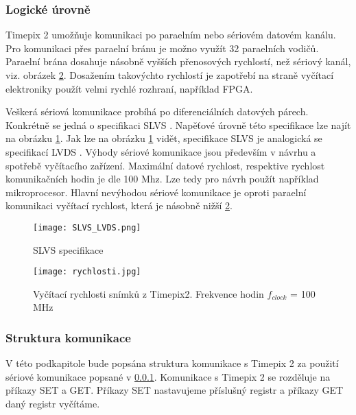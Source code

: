 \subsubsection{Logické úrovně} 	%
\label{kap:3.2.1}
Timepix 2 umožňuje komunikaci po paraelním nebo sériovém datovém kanálu. Pro komunikaci přes paraelní bránu je možno využít 32 paraelních vodičů. Paraelní brána dosahuje násobně vyšších přenosových rychlostí, než sériový kanál, viz. obrázek \ref{fig:rychlosti}. Dosažením takovýchto rychlostí je zapotřebí na straně vyčítací elektroniky použít velmi rychlé rozhraní, například FPGA.  
\par Veškerá sériová komunikace probíhá po diferenciálních datových párech. Konkrétně se jedná o specifikaci SLVS \cite{SLVS}. Napěťové úrovně této specifikace lze najít na obrázku \ref{fig:SLVS_LVDS}. Jak lze na obrázku \ref{fig:SLVS_LVDS} vidět, specifikace SLVS je analogická se specifikací LVDS \cite{LVDS}. Výhody sériové komunikace jsou především v návrhu a spotřebě vyčítacího zařízení. Maximální datové rychlost, respektive rychlost komunikačních hodin je dle \cite{tpx2_manual} 100 Mhz. Lze tedy pro návrh použít například mikroprocesor. Hlavní nevýhodou sériové komunikace je oproti paraelní komunikaci vyčítací rychlost, která je násobně nižší \ref{fig:rychlosti}.
\begin{figure}[h!]
	\centering
	\captionsetup{justification=centering}
	\texttt{[image: SLVS\_LVDS.png]}
	\caption{SLVS specifikace \cite{SLVS}} 
	\label{fig:SLVS_LVDS}
\end{figure}	
\begin{figure}[h!]
	\centering
	\captionsetup{justification=centering}
	\texttt{[image: rychlosti.jpg]}
	\caption{Vyčítací rychlosti snímků z Timepix2. Frekvence hodin $f_{clock}$ = 100 MHz \cite{tpx2_manual}} 
	\label{fig:rychlosti}
\end{figure}	

\subsubsection{Struktura komunikace}
V této podkapitole bude popsána struktura komunikace s Timepix 2 za použití sériové komunikace popsané v \ref{kap:3.2.1}.  
Komunikace s Timepix 2 se rozděluje na příkazy SET a GET. Příkazy SET nastavujeme příslušný registr a příkazy GET daný registr vyčítáme. 

